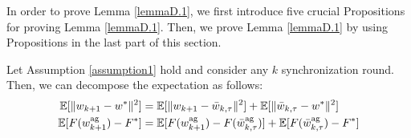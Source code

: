 \documentclass[11pt]{article}
\begin{document}

In order to prove Lemma \ref{lemmaD.1}, we first introduce five crucial Propositions for proving Lemma \ref{lemmaD.1}. Then, we prove Lemma \ref{lemmaD.1} by using Propositions in the last part of this section.
\begin{proposition} \label{propositionD.2}
Let Assumption \ref{assumption1} hold and consider any $k$ synchronization round. Then, we can decompose the expectation as follows:
\begin{align*}
    \mathbb{E}[\|w_{k+1} - w^*\|^2] &= \mathbb{E}[\|w_{k+1} - \Bar{w}_{k, \tau}\|^2] + \mathbb{E}[\|\Bar{w}_{k, \tau} - w^*\|^2] \\
    \mathbb{E}[F(w_{k+1}^{\textrm{ag}}) - F^*] &= \mathbb{E}[F(w_{k+1}^{\textrm{ag}}) - F(\Bar{w}_{k, \tau}^{\textrm{ag}})] + \mathbb{E}[F(\Bar{w}_{k, \tau}^{\textrm{ag}}) - F^*]
\end{align*}
\end{proposition}
\end{document}
